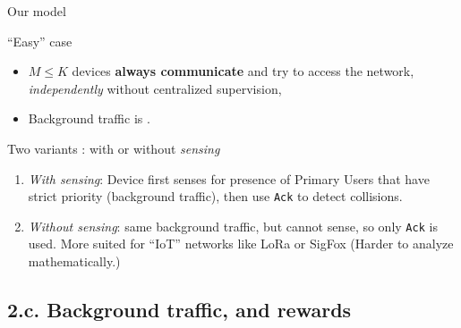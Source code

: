 \documentclass[12pt,english,ignorenonframetext,aspectratio=169,]{beamer}
\providecommand{\tightlist}{%
  \setlength{\itemsep}{0pt}\setlength{\parskip}{0pt}}
\begin{document}
\begin{frame}[fragile]{Our model}

\begin{block}{``Easy'' case}

\begin{itemize}\tightlist
\item
  \(M \leq K\) devices \textbf{always communicate} and try to access the
  network, \emph{independently} without centralized supervision,
\item
  Background traffic is \iid.
\end{itemize}

\end{block}

\begin{block}{Two variants : with or without \emph{sensing}}

\begin{enumerate}
\def\labelenumi{\arabic{enumi}.}
\tightlist
\item
  \emph{With sensing}: Device first senses for presence of Primary Users that have strict priority
  (background traffic), then use \texttt{Ack} to detect collisions.
\item
  \emph{Without sensing}: same background traffic, but cannot sense, so
  only \texttt{Ack} is used.
  \small{More suited for ``IoT'' networks like LoRa or SigFox} (Harder to
  analyze mathematically.)
\end{enumerate}

\end{block}

\end{frame}



\subsection{\hfill{}2.c. Background traffic, and rewards\hfill{}}
\end{document}
